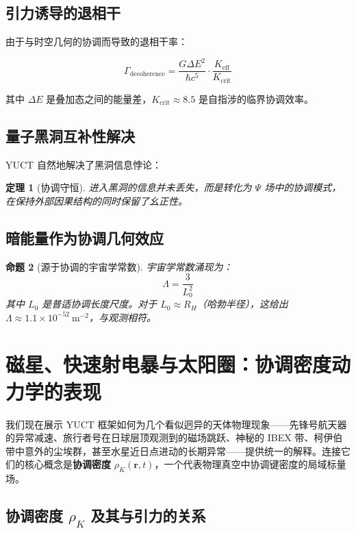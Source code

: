 \documentclass[11pt,a4paper]{article}
\newtheorem{theorem}{定理}[section]
\newtheorem{proposition}[theorem]{命题}
\theoremstyle{remark}
\newcommand{\Keff}{K_{\mathrm{eff}}}
\begin{document}
	\subsection{引力诱导的退相干}
	
	由于与时空几何的协调而导致的退相干率：
	
	\begin{equation}
		\Gamma_{\text{decoherence}} = \frac{G \Delta E^2}{\hbar c^5} \cdot \frac{\Keff}{K_{\text{crit}}}
	\end{equation}
	
	其中 $\Delta E$ 是叠加态之间的能量差，$K_{\text{crit}} \approx 8.5$ 是自指涉的临界协调效率。
	
	\subsection{量子黑洞互补性解决}
	
	YUCT 自然地解决了黑洞信息悖论：
	
	\begin{theorem}[协调守恒]
		进入黑洞的信息并未丢失，而是转化为 $\Psi$ 场中的协调模式，在保持外部因果结构的同时保留了幺正性。
	\end{theorem}
	
	\subsection{暗能量作为协调几何效应}
	
	\begin{proposition}[源于协调的宇宙学常数]
		宇宙学常数涌现为：
		\[
		\Lambda = \frac{3}{L_0^2}
		\]
		其中 $L_0$ 是普适协调长度尺度。对于 $L_0 \approx R_H$（哈勃半径），这给出 $\Lambda \approx 1.1 \times 10^{-52}\ \text{m}^{-2}$，与观测相符。
	\end{proposition}
	
	\section{磁星、快速射电暴与太阳圈：协调密度动力学的表现}
	\label{sec:coord_density}
	
	我们现在展示 YUCT 框架如何为几个看似迥异的天体物理现象——先锋号航天器的异常减速、旅行者号在日球层顶观测到的磁场跳跃、神秘的 IBEX 带、柯伊伯带中意外的尘埃群，甚至水星近日点进动的长期异常——提供统一的解释。连接它们的核心概念是\textbf{协调密度} \(\rho_K(\mathbf{r},t)\)，一个代表物理真空中协调键密度的局域标量场。
	
	\subsection{协调密度 \(\rho_K\) 及其与引力的关系}
	\label{subsec:rho_K_definition}
	
\end{document}
